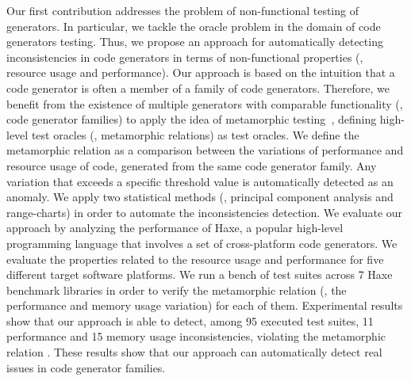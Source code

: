 Our first contribution addresses the problem of non-functional testing of generators. In particular, we tackle the oracle problem in the domain of code generators testing. Thus, we propose an approach for automatically detecting inconsistencies in code generators in terms of non-functional properties (\ie, resource usage and performance).
Our approach is based on the intuition that a code generator is often a member of a family of code generators. Therefore, we benefit from the existence of multiple generators with comparable functionality (\ie, code generator families) to apply the idea of metamorphic testing~\cite{zhou2004metamorphic}, defining high-level test oracles (\ie, metamorphic relations) as test oracles. 
We define the metamorphic relation as a comparison between the variations of performance and resource usage of code, generated from the same code generator family. Any variation that exceeds a specific threshold value is automatically detected as an anomaly. We apply two statistical methods (\ie, principal component analysis and range-charts) in order to automate the inconsistencies detection.
We evaluate our approach by analyzing the performance of Haxe, a popular high-level programming language that involves a set of cross-platform code generators. We evaluate the properties related to the resource usage and performance for five different target software platforms. 
We run a bench of test suites across 7 Haxe benchmark libraries in order to verify the metamorphic relation (\ie, the performance and memory usage variation) for each of them. Experimental results show that our approach is able to detect, among 95 executed test suites, 11 performance and 15 memory usage inconsistencies, violating the metamorphic relation . These results show that our approach can automatically detect real issues in code generator families.

